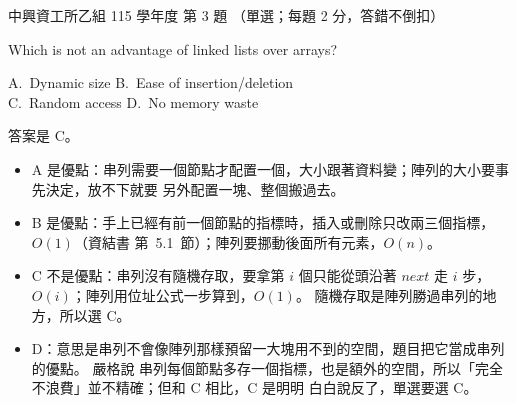\begin{pastexam}[label={px:nchu-115-is-03}]{中興資工所乙組 115 學年度 第 3 題}
（單選；每題 2 分，答錯不倒扣）

Which is not an advantage of linked lists over arrays?

A.~Dynamic size \qquad B.~Ease of insertion/deletion\\
C.~Random access \qquad D.~No memory waste
\end{pastexam}

\begin{pastsoln}
答案是 C。

\begin{itemize}
\item A 是優點：串列需要一個節點才配置一個，大小跟著資料變；陣列的大小要事先決定，放不下就要
另外配置一塊、整個搬過去。
\item B 是優點：手上已經有前一個節點的指標時，插入或刪除只改兩三個指標，$O(1)$（資結書
第~5.1~節）；陣列要挪動後面所有元素，$O(n)$。
\item C 不是優點：串列沒有隨機存取，要拿第 $i$ 個只能從頭沿著 $\mathit{next}$ 走 $i$ 步，
$O(i)$；陣列用位址公式一步算到，$O(1)$。 隨機存取是陣列勝過串列的地方，所以選 C。
\item D：意思是串列不會像陣列那樣預留一大塊用不到的空間，題目把它當成串列的優點。 嚴格說
串列每個節點多存一個指標，也是額外的空間，所以「完全不浪費」並不精確；但和 C 相比，C 是明明
白白說反了，單選要選 C。
\end{itemize}
\end{pastsoln}
